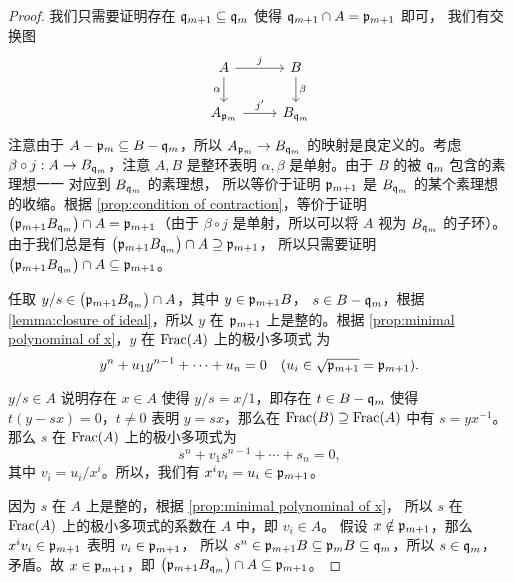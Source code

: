 \begin{proof}
  我们只需要证明存在 $\mathfrak{q}_{m+1}\subseteq\mathfrak{q}_m$ 使得 $\mathfrak{q}_{m+1}\cap A=\mathfrak{p}_{m+1}$ 即可，
  我们有交换图
  \[
    \begin{tikzcd}
      A\arrow[r,"j"]\arrow[d,"\alpha"'] & B\arrow[d,"\beta"]\\
      A_{\ideal p_{m}}\arrow[r,"j'"] & B_{\ideal q_{m}}
    \end{tikzcd}  
  \]
  注意由于 $A-\mathfrak{p}_{m}\subseteq B-\mathfrak{q}_m$，所以 $A_{\mathfrak{p}_m}\to B_{\mathfrak{q}_m}$
  的映射是良定义的。考虑 $\beta\circ j:A\to B_{\mathfrak{q}_m}$，注意 $A,B$
  是整环表明 $\alpha,\beta$ 是单射。由于 $B$ 的被 $\mathfrak{q}_m$ 包含的素理想一一
  对应到 $B_{\mathfrak{q}_m}$ 的素理想，
  所以等价于证明 $\mathfrak{p}_{m+1}$ 是 $B_{\mathfrak{q}_m}$ 的某个素理想的收缩。根据
  \autoref{prop:condition of contraction}，等价于证明
  $\bigl(\mathfrak{p}_{m+1}B_{\mathfrak{q}_m}\bigr)\cap A=\mathfrak{p}_{m+1}$（由于 $\beta\circ j$
  是单射，所以可以将 $A$ 视为 $B_{\mathfrak{q}_m}$ 的子环）。
  由于我们总是有 $\bigl(\mathfrak{p}_{m+1}B_{\mathfrak{q}_m}\bigr)\cap A\supseteq \mathfrak{p}_{m+1}$，
  所以只需要证明 $\bigl(\mathfrak{p}_{m+1}B_{\mathfrak{q}_m}\bigr)\cap A\subseteq\mathfrak{p}_{m+1}$。

  任取 $y/s\in\bigl(\mathfrak{p}_{m+1}B_{\mathfrak{q}_m}\bigr)\cap A$，其中 $y\in \mathfrak{p}_{m+1}B$，
  $s\in B-\mathfrak{q}_m$，根据 \autoref{lemma:closure of ideal}，所以 $y$ 在 $\mathfrak{p}_{m+1}$
  上是整的。根据 \autoref{prop:minimal polynominal of x}，$y$ 在 $\operatorname{Frac}(A)$ 上的极小多项式
  为
  \[
    y^n+u_1y^{n-1}+\cdots+u_n=0\quad (u_i\in\sqrt{\mathfrak{p}_{m+1}}=\mathfrak{p}_{m+1}).  
  \]

  $y/s\in A$ 说明存在 $x\in A$ 使得 $y/s=x/1$，即存在 $t\in B-\mathfrak{q}_m$ 使得
  $t(y-sx)=0$，$t\neq 0$ 表明 $y=sx$，那么在 $\operatorname{Frac}(B)\supseteq \operatorname{Frac}(A)$ 中有 $s=yx^{-1}$。
  那么 $s$ 在 $\operatorname{Frac}(A)$ 上的极小多项式为
  \[
    s^n+v_1s^{n-1}+\cdots+s_n=0,  
  \]
  其中 $v_i=u_i/x^i$。所以，我们有 $x^iv_i=u_i\in\mathfrak{p}_{m+1}$。

  因为 $s$ 在 $A$ 上是整的，根据 \autoref{prop:minimal polynominal of x}，
  所以 $s$ 在 $\operatorname{Frac}(A)$ 上的极小多项式的系数在 $A$ 中，即 $v_i\in A$。
  假设 $x\notin \mathfrak{p}_{m+1}$，那么 $x^iv_i\in\mathfrak{p}_{m+1}$ 表明 $v_i\in\mathfrak{p}_{m+1}$，
  所以 $s^n\in\mathfrak{p}_{m+1}B\subseteq \mathfrak{p}_mB\subseteq \mathfrak{q}_m$，所以 $s\in\mathfrak{q}_m$，
  矛盾。故 $x\in\mathfrak{p}_{m+1}$，即 $\bigl(\mathfrak{p}_{m+1}B_{\mathfrak{q}_m}\bigr)\cap A\subseteq\mathfrak{p}_{m+1}$。
\end{proof}

